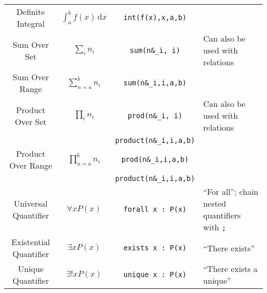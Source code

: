 \documentclass{article}
\begin{document}
\begin{table}[!h]
\begin{tabular}{|c|c|c|l|}
      Definite Integral & \( \displaystyle \int_a^b f(x) \,\mathrm{d}x \) & \texttt{int(f(x),x,a,b)} & \\[4pt]
      Sum Over Set & \( \displaystyle \sum_i n_i \) & \texttt{sum(n\&\_i, i)} & Can also be used with relations \\[2pt]
      Sum Over Range & \( \displaystyle \sum_{n=a}^b n_i \) & \texttt{sum(n\&\_i,i,a,b)} & \\[6pt]
      Product Over Set & \( \displaystyle \prod_i n_i \) & \texttt{prod(n\&\_i, i)} & Can also be used with relations \\[2pt]
            & & \texttt{product(n\&\_i,i,a,b)} & \\
      Product Over Range & \( \displaystyle \prod_{n=a}^b n_i \) & \texttt{prod(n\&\_i,i,a,b)} & \\
            & & \texttt{product(n\&\_i,i,a,b)} & \\
      \hline
      Universal Quantifier & \( \forall x P(x) \) & \texttt{forall x : \!\!P(x)} & ``For all''; chain nested quantifiers with \texttt{;} \\
      Existential Quantifier & \( \exists x P(x) \) & \texttt{exists x : \!\!P(x)} & ``There exists'' \\
      Unique Quantifier & \( \exists ! x P(x) \) & \texttt{unique x : \!\!P(x)} & ``There exists a unique'' \\
      \hline
    \end{tabular}
  \end{table}
\end{document}
